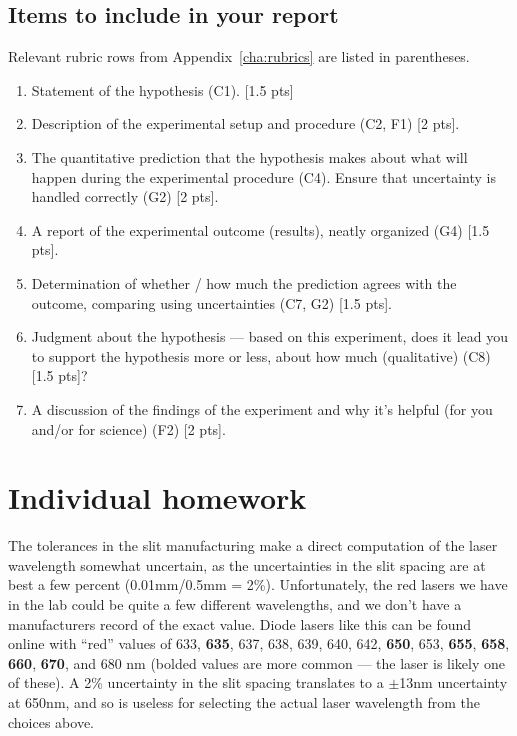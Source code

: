 \subsection{Items to include in your report}

Relevant rubric rows from Appendix~\ref{cha:rubrics} are listed in parentheses.

\begin{enumerate}
	\item Statement of the hypothesis (C1). [1.5 pts]

	\item Description of the experimental setup and procedure (C2, F1) [2 pts].
	
	\item The quantitative prediction that the hypothesis makes about what will happen during the experimental procedure (C4). Ensure that uncertainty is handled correctly (G2) [2 pts].
	
	\item A report of the experimental outcome (results), neatly organized (G4) [1.5 pts].
	
	\item Determination of whether / how much the prediction agrees with the outcome, comparing using uncertainties (C7, G2) [1.5 pts].
	
	\item Judgment about the hypothesis --- based on this experiment, does it lead you to support the hypothesis more or less, about how much (qualitative) (C8) [1.5 pts]?
	
	\item A discussion of the findings of the experiment and why it's helpful (for you and/or for science) (F2) [2 pts].
\end{enumerate}

\section{Individual homework}

The tolerances in the slit manufacturing make a direct computation of the laser wavelength somewhat uncertain, as the uncertainties in the slit spacing are at best a few percent (0.01mm/0.5mm = 2\%). Unfortunately, the red lasers we have in the lab could be quite a few different wavelengths, and we don't have a manufacturers record of the exact value. Diode lasers like this can be found online with “red” values of 633, \textbf{635}, 637, 638, 639, 640, 642, \textbf{650}, 653, \textbf{655}, \textbf{658}, \textbf{660}, \textbf{670}, and 680 nm (bolded values are more common --- the laser is likely one of these).
A 2\% uncertainty in the slit spacing translates to a $\pm$13nm uncertainty at 650nm, and so is useless for selecting the actual laser wavelength from the choices above.

